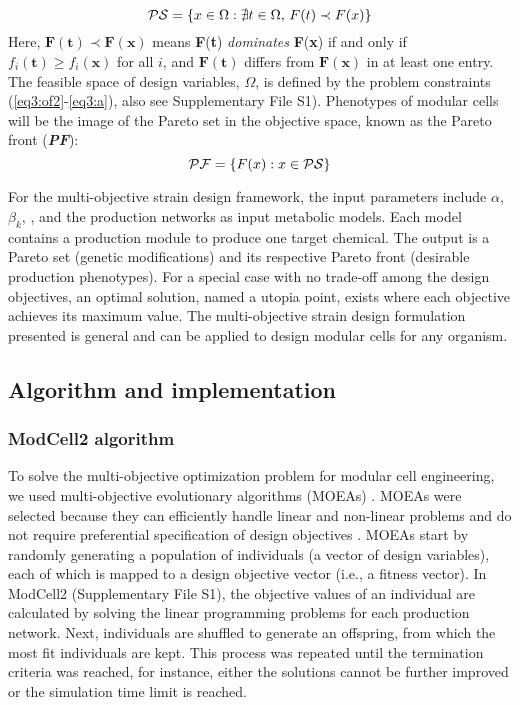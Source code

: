 \begin{equation}
\mathcal{PS} = \{ x \in \Omega: \nexists t \in \Omega, \, F(t) \prec F(x) \}
\end{equation}
\noindent Here, \(\mathbf{F}\left( \mathbf{t} \right)\mathbf{\prec}\mathbf{F}\left( \mathbf{x} \right)\) means \textbf{F}(\textbf{t}) \emph{dominates} \textbf{F}(\textbf{x}) if and only if \(f_{i}\left( \mathbf{t} \right) \geq f_{i}\left( \mathbf{x} \right)\) for all \(i\), and \(\mathbf{F}\left( \mathbf{t} \right)\) differs from \(\mathbf{F}\left( \mathbf{x} \right)\) in at least one entry.
The feasible space of design variables, \(\Omega\), is defined by the problem constraints (\ref{eq3:of2}-\ref{eq3:a}), also see Supplementary File S1).
Phenotypes of modular cells will be the image of the Pareto set in the objective space, known as the Pareto front (\emph{\textbf{PF}}):
\begin{equation}
    \mathcal{PF} = \{ F(x):x \in \mathcal{PS} \}
\end{equation}

For the multi-objective strain design framework, the input parameters include $\alpha$, $\beta_k$,
, and the production networks as input metabolic models.
Each model contains a production module to produce one target chemical.
The output is a Pareto set (genetic modifications) and its respective Pareto front (desirable production phenotypes).
For a special case with no trade-off among the design objectives, an optimal solution, named a utopia point, exists where each objective achieves its maximum value.
The multi-objective strain design formulation presented is general and can be applied to design modular cells for any organism.

\subsection{Algorithm and implementation}

\subsubsection{ModCell2 algorithm}
To solve the multi-objective
optimization problem for modular cell engineering, we used
multi-objective evolutionary algorithms (MOEAs)
\citep{coello2002}. MOEAs were selected because they can
efficiently handle linear and non-linear problems and do not require
preferential specification of design objectives
\citep{marler2004}. MOEAs start by randomly generating a
population of individuals (a vector of design variables), each of which
is mapped to a design objective vector (i.e., a fitness vector). In
ModCell2 (Supplementary File S1), the objective values of an individual
are calculated by solving the linear programming problems for each
production network. Next, individuals are shuffled to generate an
offspring, from which the most fit individuals are kept. This process
was repeated until the termination criteria was reached, for instance,
either the solutions cannot be further improved or the simulation time
limit is reached.

